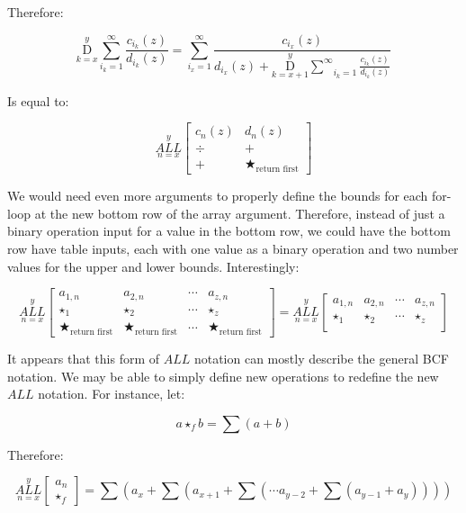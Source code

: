 \documentclass{article}
\begin{document}
Therefore:

$$\underset{k=x}{\overset{y}{ \mathrm D}} \underset{i_k=1}{\overset{\infty}{ \sum}} \frac{c_{i_k} (z)}{d_{i_k} (z)} = \underset{i_x=1}{\overset{\infty}{ \sum}} \frac{c_{i_x}(z)}{d_{i_x}(z)+ \underset{k=x+1}{\overset{y}{ \mathrm D}} \underset{i_k=1}{\overset{\infty}{ \sum}} \frac{c_{i_k} (z)}{d_{i_k} (z)}}$$

Is equal to:

$$\underset{n=x}{\overset{y}{ALL}}
\begin{bmatrix}
c_n(z) & d_n(z) \\
\div & + \\ + & \bigstar_{\text{return first}}
\end{bmatrix}$$

We would need even more arguments to properly define the bounds for each for-loop at the new bottom row of the array argument. Therefore, instead of just a binary operation input for a value in the bottom row, we could have the bottom row have table inputs, each with one value as a binary operation and two number values for the upper and lower bounds. Interestingly:

$$\underset{n=x}{\overset{y}{ALL}}
\begin{bmatrix}
a_{1,n} & a_{2,n} & \cdots & a_{z,n} \\
\star_1 & \star_2 & \cdots & \star_z \\ \bigstar_{\text{return first}} & \bigstar_{\text{return first}} & \cdots & \bigstar_{\text{return first}}
\end{bmatrix}=\underset{n=x}{\overset{y}{ALL}}
\begin{bmatrix}
a_{1,n} & a_{2,n} & \cdots & a_{z,n} \\
\star_1 & \star_2 & \cdots & \star_z \\
\end{bmatrix}$$

It appears that this form of $ALL$ notation can mostly describe the general BCF notation. We may be able to simply define new operations to redefine the new $ALL$ notation. For instance, let:

$$a \star_f b = \sum (a+b)$$

Therefore:

$$\underset{n=x}{\overset{y}{ALL}}
\begin{bmatrix}
a_n \\ \star_f \end{bmatrix} = \sum (a_x+\sum(a_{x+1}+\sum(\cdots a_{y-2} + \sum(a_{y-1} +a_y))))$$
\end{document}
